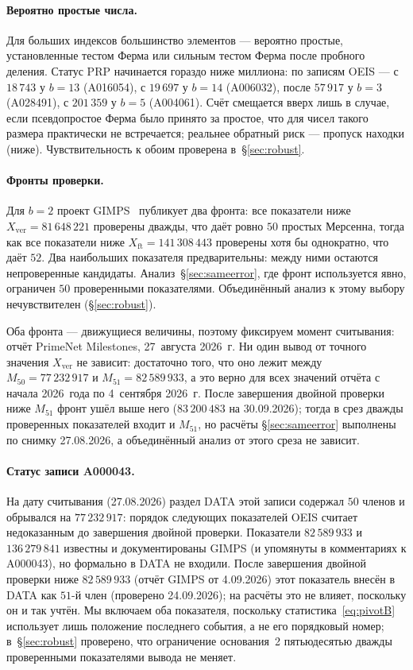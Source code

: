 \documentclass[11pt,a4paper]{article}
\theoremstyle{plain}
\theoremstyle{remark}
\begin{document}
\paragraph{Вероятно простые числа.} Для больших индексов большинство элементов ---
вероятно простые, установленные тестом Ферма или сильным тестом Ферма после пробного
деления. Статус PRP начинается гораздо ниже миллиона: по записям OEIS --- с
$18\,743$ у $b=13$ (A016054), с $19\,697$ у $b=14$ (A006032), после $57\,917$ у
$b=3$ (A028491), с $201\,359$ у $b=5$ (A004061). Счёт смещается вверх лишь в
случае, если псевдопростое Ферма было принято за простое, что для чисел такого
размера практически не встречается; реальнее обратный риск --- пропуск находки
(ниже). Чувствительность к обоим проверена в~\S\ref{sec:robust}.

\paragraph{Фронты проверки.} Для $b=2$ проект GIMPS~\cite{gimps} публикует два фронта:
все показатели ниже $X_{\mathrm{ver}}=81\,648\,221$ проверены дважды, что даёт ровно $50$
простых Мерсенна, тогда как все показатели ниже $X_{\mathrm{ft}}=141\,308\,443$ проверены
хотя бы однократно, что даёт $52$. Два наибольших показателя предварительны: между ними
остаются непроверенные кандидаты. Анализ~\S\ref{sec:sameerror}, где фронт используется
явно, ограничен $50$ проверенными показателями. Объединённый анализ к этому выбору
нечувствителен (\S\ref{sec:robust}).

Оба фронта --- движущиеся величины, поэтому фиксируем момент считывания: отчёт
PrimeNet Milestones, 27~августа 2026~г. Ни один вывод от точного значения
$X_{\mathrm{ver}}$ не зависит: достаточно того, что оно лежит между
$M_{50}=77\,232\,917$ и $M_{51}=82\,589\,933$, а это верно для всех значений отчёта
с начала 2026~года по 4~сентября 2026~г. После завершения двойной проверки ниже
$M_{51}$ фронт ушёл выше него ($83\,200\,483$ на 30.09.2026); тогда в срез дважды
проверенных показателей входит и $M_{51}$, но расчёты \S\ref{sec:sameerror}
выполнены по снимку 27.08.2026, а объединённый анализ от этого среза не зависит.

\paragraph{Статус записи A000043.} На дату считывания (27.08.2026) раздел DATA этой
записи содержал $50$ членов и обрывался на $77\,232\,917$: порядок следующих
показателей OEIS считает недоказанным до завершения двойной проверки. Показатели
$82\,589\,933$ и $136\,279\,841$ известны и документированы GIMPS (и упомянуты в
комментариях к A000043), но формально в DATA не входили. После завершения двойной
проверки ниже $82\,589\,933$ (отчёт GIMPS от 4.09.2026) этот показатель внесён в
DATA как $51$-й член (проверено 24.09.2026); на расчёты это не влияет, поскольку он
и так учтён. Мы включаем оба показателя, поскольку статистика~\eqref{eq:pivotB} использует лишь положение
последнего события, а не его порядковый номер; в~\S\ref{sec:robust} проверено, что
ограничение основания~2 пятьюдесятью дважды проверенными показателями вывода не меняет.
\end{document}
